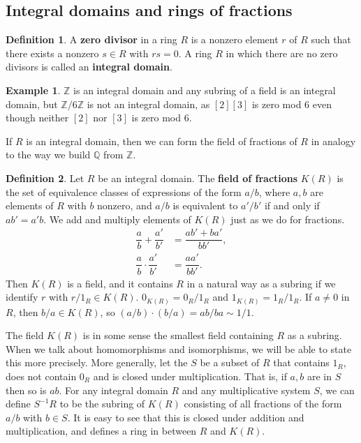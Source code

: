\documentclass{article}
\newcommand{\Z}{\mathbb{Z}}
\newcommand{\Q}{\mathbb{Q}}
\newcommand{\rb}[1]{\left( #1 \right)}
\renewcommand{\sb}[1]{\left[ #1 \right]}
\theoremstyle{definition}\newtheorem{definition}{Definition}[subsection]
\theoremstyle{definition}\newtheorem{remark}[definition]{Remark}
\theoremstyle{definition}\newtheorem*{example}{Example}
\theoremstyle{definition}\newtheorem*{note}{Note}
\begin{document}

\subsection{Integral domains and rings of fractions}

\begin{definition}
A \textbf{zero divisor} in a ring $ R $ is a nonzero element $ r $ of $ R $ such that there exists a nonzero $ s \in R $ with $ rs = 0 $. A ring $ R $ in which there are no zero divisors is called an \textbf{integral domain}.
\end{definition}

\begin{example}
$ \Z $ is an integral domain and any subring of a field is an integral domain, but $ \Z / 6\Z $ is not an integral domain, as $ \sb{2}\sb{3} $ is zero mod $ 6 $ even though neither $ \sb{2} $ nor $ \sb{3} $ is zero mod $ 6 $.
\end{example}

If $ R $ is an integral domain, then we can form the field of fractions of $ R $ in analogy to the way we build $ \Q $ from $ \Z $.

\begin{definition}
Let $ R $ be an integral domain. The \textbf{field of fractions} $ K\rb{R} $ is the set of equivalence classes of expressions of the form $ a / b $, where $ a, b $ are elements of $ R $ with $ b $ nonzero, and $ a / b $ is equivalent to $ a' / b' $ if and only if $ ab' = a'b $. We add and multiply elements of $ K\rb{R} $ just as we do for fractions.
\begin{align*}
\dfrac{a}{b} + \dfrac{a'}{b'} & = \dfrac{ab' + ba'}{bb'}, \\
\dfrac{a}{b} \cdot \dfrac{a'}{b'} & = \dfrac{aa'}{bb'}.
\end{align*}
Then $ K\rb{R} $ is a field, and it contains $ R $ in a natural way as a subring if we identify $ r $ with $ r / 1_R \in K\rb{R} $. $ 0_{K\rb{R}} = 0_R / 1_R $ and $ 1_{K\rb{R}} = 1_R / 1_R $. If $ a \ne 0 $ in $ R $, then $ b / a \in K\rb{R} $, so $ \rb{a / b} \cdot \rb{b / a} = ab / ba \sim 1 / 1 $.
\end{definition}

The field $ K\rb{R} $ is in some sense the smallest field containing $ R $ as a subring. When we talk about homomorphisms and isomorphisms, we will be able to state this more precisely. More generally, let the  $ S $ be a subset of $ R $ that contains $ 1_R $, does not contain $ 0_R $ and is closed under multiplication. That is, if $ a, b $ are in $ S $ then so is $ ab $. For any integral domain $ R $ and any multiplicative system $ S $, we can define $ S^{-1}R $ to be the subring of $ K\rb{R} $ consisting of all fractions of the form $ a / b $ with $ b \in S $. It is easy to see that this is closed under addition and multiplication, and defines a ring in between $ R $ and $ K\rb{R} $.
\end{document}
